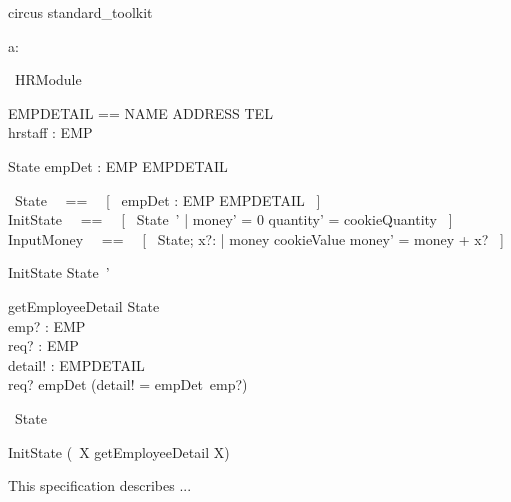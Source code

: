 \documentclass{article}
\begin{document}
\begin{zsection}
  \SECTION circus \parents standard\_toolkit
\end{zsection}

\begin{zed}
\end{zed}


\begin{circus}
	\circchannel a: \nat 
\end{circus}

\begin{circus}
   \circprocess\ HRModule \circdef \circbegin
\end{circus}


\begin{zed}
\end{zed}

\begin{axdef}
  EMPDETAIL == NAME \cross ADDRESS \cross TEL	\\
  hrstaff : \power EMP							\\
\end{axdef}

\begin{schema}{State}
  empDet : EMP \pfun EMPDETAIL
\end{schema}
\begin{circus}
\circstate\ State ~~==~~ [~ empDet : EMP \pfun EMPDETAIL ~]  \\
    InitState ~~==~~ [~ State~' | money' = 0 \land quantity' = cookieQuantity ~] \\
    InputMoney ~~==~~ [~ \Delta State; x?: \nat | money \leq cookieValue \land money' = money + x? ~] \\
\end{circus}
    
\begin{schema}{InitState}
  State~'
\end{schema}

\begin{schema}{getEmployeeDetail}
  \Xi State					\\
  emp? : EMP				\\
  req? : EMP				\\ 
  detail! : EMPDETAIL		\\
\where
  req? \in \dom empDet	\land (detail! = empDet\ emp?) \\
\end{schema}

\begin{circusaction}
   \circstate\ State
\end{circusaction}

\begin{circusaction}
    InitState \circseq (\circmu\ X \circspot getEmployeeDetail \circseq X)
\end{circusaction}


\begin{circus}
	\circend 
\end{circus}


This specification describes ...
\end{document}
